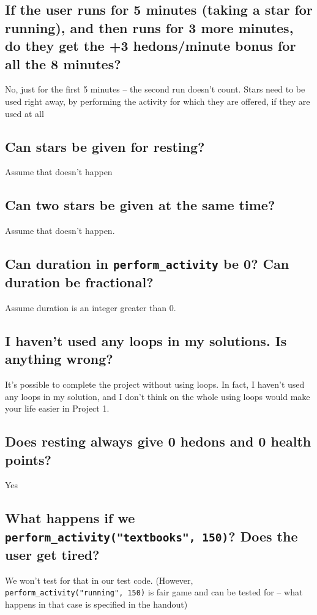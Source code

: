 \documentclass[11pt]{article}
\begin{document}
\subsection{If the user runs for 5 minutes (taking a star for running), and then runs for 3 more minutes, do they get the +3 hedons/minute bonus for all the 8 minutes?}

No, just for the first 5 minutes -- the second run doesn't count. Stars need to be used right away, by performing the activity for which they are offered, if they are used at all

\subsection{Can stars be given for resting?}
Assume that doesn't happen

\subsection{Can two stars be given at the same time?}
Assume that doesn't happen.


\subsection{Can duration in \texttt{perform\_activity} be 0? Can duration be fractional?}

Assume duration is an integer greater than 0.


\subsection{I haven't used any loops in my solutions. Is anything wrong?}

It's possible to complete the project without using loops. In fact, I haven't used any loops in my solution, and I don't think on the whole using loops would make your life easier in Project 1.

\subsection{Does resting always give 0 hedons and 0 health points?}

Yes

\subsection{What happens if we \texttt{perform\_activity("textbooks", 150)}? Does the user get tired?}

We won't test for that in our test code. (However,  \texttt{perform\_activity("running", 150)} is fair game and can be tested for -- what happens in that case is specified in the handout)
\end{document}
